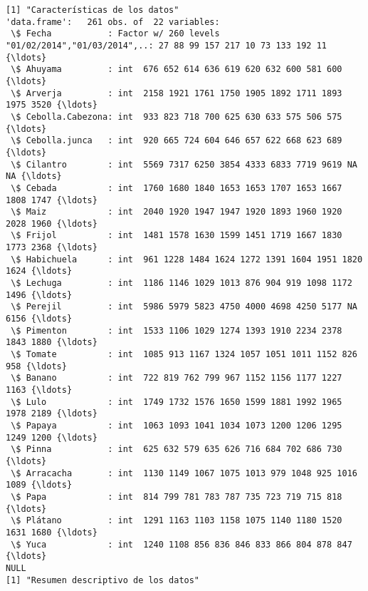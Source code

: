 \documentclass[11pt]{article}
\begin{document}
    
    \begin{Verbatim}[commandchars=\\\{\}]
[1] "Características de los datos"
'data.frame':	261 obs. of  22 variables:
 \$ Fecha           : Factor w/ 260 levels "01/02/2014","01/03/2014",..: 27 88 99 157 217 10 73 133 192 11 {\ldots}
 \$ Ahuyama         : int  676 652 614 636 619 620 632 600 581 600 {\ldots}
 \$ Arverja         : int  2158 1921 1761 1750 1905 1892 1711 1893 1975 3520 {\ldots}
 \$ Cebolla.Cabezona: int  933 823 718 700 625 630 633 575 506 575 {\ldots}
 \$ Cebolla.junca   : int  920 665 724 604 646 657 622 668 623 689 {\ldots}
 \$ Cilantro        : int  5569 7317 6250 3854 4333 6833 7719 9619 NA NA {\ldots}
 \$ Cebada          : int  1760 1680 1840 1653 1653 1707 1653 1667 1808 1747 {\ldots}
 \$ Maiz            : int  2040 1920 1947 1947 1920 1893 1960 1920 2028 1960 {\ldots}
 \$ Frijol          : int  1481 1578 1630 1599 1451 1719 1667 1830 1773 2368 {\ldots}
 \$ Habichuela      : int  961 1228 1484 1624 1272 1391 1604 1951 1820 1624 {\ldots}
 \$ Lechuga         : int  1186 1146 1029 1013 876 904 919 1098 1172 1496 {\ldots}
 \$ Perejil         : int  5986 5979 5823 4750 4000 4698 4250 5177 NA 6156 {\ldots}
 \$ Pimenton        : int  1533 1106 1029 1274 1393 1910 2234 2378 1843 1880 {\ldots}
 \$ Tomate          : int  1085 913 1167 1324 1057 1051 1011 1152 826 958 {\ldots}
 \$ Banano          : int  722 819 762 799 967 1152 1156 1177 1227 1163 {\ldots}
 \$ Lulo            : int  1749 1732 1576 1650 1599 1881 1992 1965 1978 2189 {\ldots}
 \$ Papaya          : int  1063 1093 1041 1034 1073 1200 1206 1295 1249 1200 {\ldots}
 \$ Pinna           : int  625 632 579 635 626 716 684 702 686 730 {\ldots}
 \$ Arracacha       : int  1130 1149 1067 1075 1013 979 1048 925 1016 1089 {\ldots}
 \$ Papa            : int  814 799 781 783 787 735 723 719 715 818 {\ldots}
 \$ Plátano         : int  1291 1163 1103 1158 1075 1140 1180 1520 1631 1680 {\ldots}
 \$ Yuca            : int  1240 1108 856 836 846 833 866 804 878 847 {\ldots}
NULL
[1] "Resumen descriptivo de los datos"

    \end{Verbatim}
\end{document}
